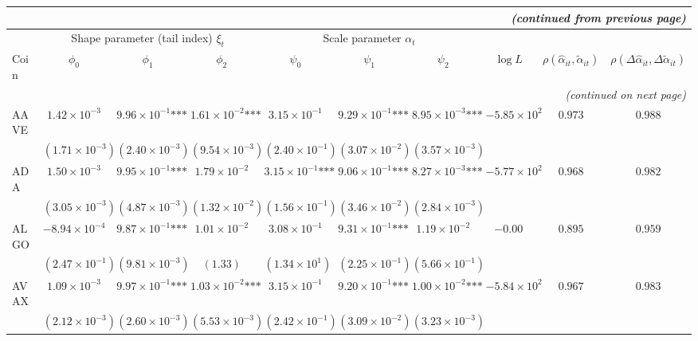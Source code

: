 \documentclass{article}
\begin{document}
\begin{landscape}
\begin{longtable}{lccccccccc}
\multicolumn{10}{r}{\textit{(continued from previous page)}}\\
\toprule
& \multicolumn{3}{c}{Shape parameter (tail index) $\xi_t$}
& \multicolumn{3}{c}{Scale parameter $\alpha_t$}
& & & \\
\cmidrule(lr){2-4} \cmidrule(lr){5-7}
Coin
& $\phi_0$ & $\phi_1$ & $\phi_2$
& $\psi_0$ & $\psi_1$ & $\psi_2$
& $\log L$
& $\rho(\hat{\alpha}_{it},\tilde{\alpha}_{it})$
& $\rho(\Delta\hat{\alpha}_{it},\Delta\tilde{\alpha}_{it})$ \\
\midrule
\endhead

\midrule
\multicolumn{10}{r}{\textit{(continued on next page)}}\\
\endfoot

\bottomrule
\endlastfoot
AAVE & $1.42\times 10^{-3}$ & $9.96\times 10^{-1}\text{***}$ & $1.61\times 10^{-2}\text{***}$ & $3.15\times 10^{-1}$ & $9.29\times 10^{-1}\text{***}$ & $8.95\times 10^{-3}\text{***}$ & $-5.85\times 10^{2}$ & $0.973$ & $0.988$ \\
 & $(1.71\times 10^{-3})$ & $(2.40\times 10^{-3})$ & $(9.54\times 10^{-3})$ & $(2.40\times 10^{-1})$ & $(3.07\times 10^{-2})$ & $(3.57\times 10^{-3})$ &  &  &  \\
ADA & $1.50\times 10^{-3}$ & $9.95\times 10^{-1}\text{***}$ & $1.79\times 10^{-2}$ & $3.15\times 10^{-1}\text{***}$ & $9.06\times 10^{-1}\text{***}$ & $8.27\times 10^{-3}\text{***}$ & $-5.77\times 10^{2}$ & $0.968$ & $0.982$ \\
 & $(3.05\times 10^{-3})$ & $(4.87\times 10^{-3})$ & $(1.32\times 10^{-2})$ & $(1.56\times 10^{-1})$ & $(3.46\times 10^{-2})$ & $(2.84\times 10^{-3})$ &  &  &  \\
ALGO & $-8.94\times 10^{-4}$ & $9.87\times 10^{-1}\text{***}$ & $1.01\times 10^{-2}$ & $3.08\times 10^{-1}$ & $9.31\times 10^{-1}\text{***}$ & $1.19\times 10^{-2}$ & $-0.00$ & $0.895$ & $0.959$ \\
 & $(2.47\times 10^{-1})$ & $(9.81\times 10^{-3})$ & $(1.33)$ & $(1.34\times 10^{1})$ & $(2.25\times 10^{-1})$ & $(5.66\times 10^{-1})$ &  &  &  \\
AVAX & $1.09\times 10^{-3}$ & $9.97\times 10^{-1}\text{***}$ & $1.03\times 10^{-2}\text{***}$ & $3.15\times 10^{-1}$ & $9.20\times 10^{-1}\text{***}$ & $1.00\times 10^{-2}\text{***}$ & $-5.84\times 10^{2}$ & $0.967$ & $0.983$ \\
 & $(2.12\times 10^{-3})$ & $(2.60\times 10^{-3})$ & $(5.53\times 10^{-3})$ & $(2.42\times 10^{-1})$ & $(3.09\times 10^{-2})$ & $(3.23\times 10^{-3})$ &  &  &  \\

\end{longtable}
\end{landscape}
\end{document}
